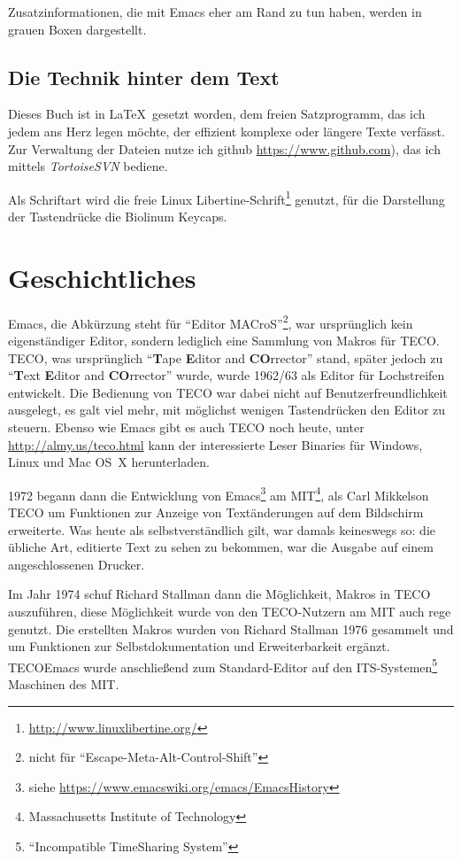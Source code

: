 \documentclass[12pt,ngerman]{scrbook}
\begin{document}
Zusatzinformationen, die mit Emacs eher am Rand zu tun haben, werden in grauen Boxen dargestellt.

\section*{Die Technik hinter dem Text}

Dieses Buch ist in \LaTeX\ gesetzt worden, dem freien Satzprogramm, das ich jedem ans Herz legen möchte, der effizient komplexe oder längere Texte verfässt. Zur Verwaltung der Dateien nutze ich github \url{https://www.github.com}), das ich mittels \textit{TortoiseSVN} bediene. 

Als Schriftart wird die freie Linux Libertine-Schrift\footnote{\url{http://www.linuxlibertine.org/}} genutzt, für die Darstellung der Tastendrücke die Biolinum Keycaps.



\mainmatter

\chapter{Geschichtliches}

Emacs, die Abkürzung steht für \enquote{Editor MACroS}\footnote{nicht für \enquote{Escape-Meta-Alt-Control-Shift}}, war ursprünglich kein eigenständiger Editor, sondern lediglich eine Sammlung von Makros für TECO. 
TECO, was ursprünglich \enquote{\textbf{T}ape \textbf{E}ditor and \textbf{CO}rrector} stand, später jedoch zu \enquote{\textbf{T}ext \textbf{E}ditor and \textbf{CO}rrector} wurde, wurde 1962/63 als Editor für Lochstreifen entwickelt. 
Die Bedienung von TECO war dabei nicht auf Benutzerfreundlichkeit ausgelegt, es galt viel mehr, mit möglichst wenigen Tastendrücken den Editor zu steuern. 
Ebenso wie Emacs gibt es auch TECO noch heute, unter \url{http://almy.us/teco.html} kann der interessierte Leser Binaries für Windows, Linux und Mac OS~X herunterladen. 

1972 begann dann die Entwicklung von Emacs\footnote{siehe \url{https://www.emacswiki.org/emacs/EmacsHistory}} am MIT\footnote{Massachusetts Institute of Technology}, als Carl Mikkelson TECO um Funktionen zur Anzeige von Textänderungen auf dem Bildschirm erweiterte. 
Was heute als selbstverständlich gilt, war damals keineswegs so: die übliche Art, editierte Text zu sehen zu bekommen, war die Ausgabe auf einem angeschlossenen Drucker.

Im Jahr 1974 schuf Richard Stallman dann die Möglichkeit, Makros in TECO auszuführen, diese Möglichkeit wurde von den TECO-Nutzern am MIT auch rege genutzt. 
Die erstellten Makros wurden von Richard Stallman 1976 gesammelt und um Funktionen zur Selbstdokumentation und Erweiterbarkeit ergänzt. 
TECOEmacs wurde anschließend zum Standard-Editor auf den ITS-Systemen\footnote{\enquote{Incompatible TimeSharing System}} Maschinen des MIT.
\end{document}
